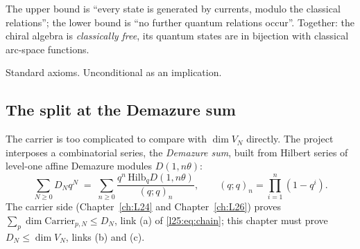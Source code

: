 \begin{physics}
The upper bound is ``every state is generated by currents, modulo the classical relations''; the lower bound
is ``no further quantum relations occur''. Together: the chiral algebra is \emph{classically free}, its
quantum states are in bijection with classical arc-space functions.
\end{physics}
\begin{status}
Standard axioms. Unconditional as an implication.
\end{status}

\subsection{The split at the Demazure sum}

The carrier is too complicated to compare with $\dim V_N$ directly. The project interposes a combinatorial
series, the \emph{Demazure sum}, built from Hilbert series of level-one affine Demazure modules $D(1,n\theta)$:
\begin{equation}\label{l25:eq:dsum}
\sum_{N\ge0}D_Nq^N \;=\;\sum_{n\ge0}\frac{q^n\,\mathrm{Hilb}_q D(1,n\theta)}{(q;q)_n},\qquad
(q;q)_n=\prod_{i=1}^n(1-q^i).
\end{equation}
The carrier side (Chapter~\ref{ch:L24} and Chapter~\ref{ch:L26}) proves $\sum_p\dim\mathrm{Carrier}_{p,N}\le D_N$,
link (a) of \eqref{l25:eq:chain}; this chapter must prove $D_N\le\dim V_N$, links (b) and (c).

